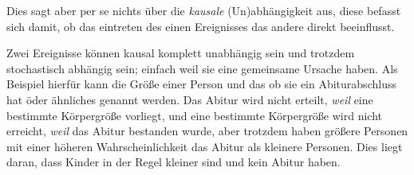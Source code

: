 \documentclass{article}
\begin{document}
Dies sagt aber per se nichts über die \emph{kausale} (Un)abhängigkeit aus, diese befasst sich damit, ob das eintreten des einen Ereignisses das andere direkt beeinflusst.
 
Zwei Ereignisse können kausal komplett unabhängig sein und trotzdem stochastisch abhängig sein; einfach weil sie eine gemeinsame Ursache haben.
Als Beispiel hierfür kann die Größe einer Person und das ob sie ein Abiturabschluss hat öder ähnliches genannt werden. Das Abitur wird nicht erteilt, \emph{weil} eine bestimmte Körpergröße vorliegt, und eine bestimmte Körpergröße wird nicht erreicht, \emph{weil} das Abitur bestanden wurde, aber trotzdem haben größere Personen mit einer höheren Wahrscheinlichkeit das Abitur als kleinere Personen. Dies liegt daran, dass Kinder in der Regel kleiner sind und kein Abitur haben.
\end{document}
